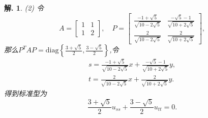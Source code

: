 \documentclass[a4paper,oneside,12pt]{ctexart}
\theoremstyle{plain}
\theoremstyle{nonumberplain}
\newtheorem{solution}{解.}
\theoremstyle{nonumberplain}
\newcommand{\diag}{\mathrm{diag}}
\begin{document}
\begin{solution}
        (2) 令
        \begin{equation*}
            A=\begin{bmatrix}
                1 & 1\\
                1 & 2
            \end{bmatrix},\quad P=\begin{bmatrix}
                \frac{-1+\sqrt{5}}{\sqrt{10-2\sqrt{5}}} & \frac{-\sqrt{5}-1}{\sqrt{10+2\sqrt{5}}} \\
                \frac{2}{\sqrt{10-2\sqrt{5}}} & \frac{2}{\sqrt{10+2\sqrt{5}}}
            \end{bmatrix},
        \end{equation*}
        那么$P^TAP=\diag\left\{\frac{3+\sqrt{5}}{2},\frac{3-\sqrt{5}}{2}\right\}$,令
        \begin{align*}
            s=\frac{-1+\sqrt{5}}{\sqrt{10-2\sqrt{5}}}x+\frac{-\sqrt{5}-1}{\sqrt{10+2\sqrt{5}}}y,\\
            t=\frac{2}{\sqrt{10-2\sqrt{5}}}x+\frac{2}{\sqrt{10+2\sqrt{5}}}y.
        \end{align*}
        得到标准型为
        \begin{equation*}
            \frac{3+\sqrt{5}}{2}u_{ss}+\frac{3-\sqrt{5}}{2}u_{tt}=0.
        \end{equation*}
    \end{solution}
\end{document}

